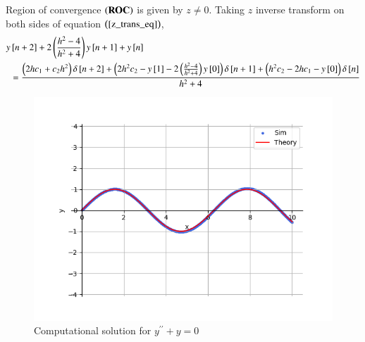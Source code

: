 \documentclass[journal]{IEEEtran}
\begin{document}
Region of convergence $\left(\textbf{ROC}\right)$ is given by $z \neq 0$.
Taking $z$ inverse transform on both sides of equation $\left(\ref{z_trans_eq}\right)$,
\begin{align}
    y&{}\left[n + 2\right] + 2\left(\frac{h^2 - 4}{h^2 + 4}\right) y{}\left[n + 1\right] + y{}\left[n\right] \nonumber\\
    &= \frac{\left(2h c_1 + c_2 h^2\right)\delta{}\left[n + 2\right] + \left(2h^2 c_2 - y{}\left[1\right] - 2\left(\frac{h^2 - 4}{h^2 + 4}\right)y{}\left[0\right]\right)\delta{}\left[n + 1\right] + \left(h^2c_2 - 2hc_1 - y{}\left[0\right]\right)\delta{}\left[n\right]}{h^2 + 4}
\end{align}

\begin{figure}[h!]
    \centering
    \includegraphics[width=0.7\columnwidth]{figs/graph.png}
    \caption{Computational solution for $y^{\prime\prime} + y = 0$}
    \label{label}
\end{figure}
\end{document}
